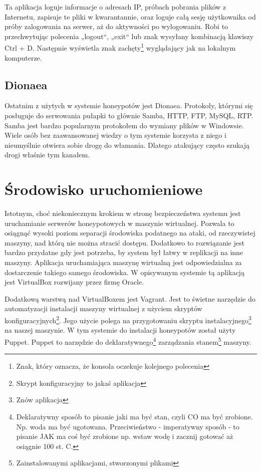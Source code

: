\documentclass[runningheads,a4paper]{llncs}
\begin{document}
Ta aplikacja loguje informacje o adresach IP, próbach pobrania plików z Internetu, zapisuje te pliki w kwarantannie, oraz loguje całą sesję użytkownika od próby zalogowania na serwer, aż do aktywności po wylogowaniu. Robi to przechwytując polecenia „logout“, „exit“ lub znak wysyłany kombinacją klawiszy Ctrl + D. Następnie wyświetla znak zachęty\footnote{Znak, który oznacza, że konsola oczekuje kolejnego polecenia} wyglądający jak na lokalnym komputerze.

\subsection{Dionaea}

Ostatnim z użytych w systemie honeypotów jest Dionaea. Protokoły, którymi się posługuje do serwowania pułapki to głównie Samba, HTTP, FTP, MySQL, RTP. Samba jest bardzo popularnym protokołem do wymiany plików w Windowsie. Wiele osób bez zaawansowanej wiedzy o tym systemie korzysta z niego i nieumyślnie otwiera sobie drogę do włamania. Dlatego atakujący często szukają drogi właśnie tym kanałem.

\section{Środowisko uruchomieniowe}

Istotnym, choć niekoniecznym krokiem w stronę bezpieczeństwa systemu jest uruchamianie serwerów honeypotowych w maszynie wirtualnej. Pozwala to osiągnąć wysoki poziom separacji środowiska podatnego na ataki, od rzeczywistej maszyny, nad którą nie można stracić dostępu. Dodatkowo to rozwiązanie jest bardzo przydatne gdy jest potrzeba, by system był łatwy w replikacji na inne maszyny. Aplikacja uruchamiająca maszynę wirtualną jest odpowiedzialna za dostarczenie takiego samego środowiska. W opisywanym systemie tą aplikacją jest VirtualBox rozwijany przez firmę Oracle.

Dodatkową warstwą nad VirtualBoxem jest Vagrant. Jest to świetne narzędzie do automatyzacji instalacji maszyny wirtualnej z użyciem skryptów konfiguracyjnych\footnote{Skrypt konfiguracyjny to jakaś aplikacja}. Jego użycie polega na przygotowaniu skryptu instalacyjnego\footnote{Znów aplikacja} na naszej maszynie. W tym systemie do instalacji honeypotów został użyty Puppet. Puppet to narzędzie do deklaratywnego\footnote{Deklaratywny sposób to pisanie jaki ma być stan, czyli CO ma być zrobione. Np. woda ma być ugotowana. Przeciwieństwo - imperatywny sposób - to pisanie JAK ma coś być zrobione np. wstaw wodę i zacznij gotować aż osiągnie 100 st. C.} zarządzania stanem\footnote{Zainstalowanymi aplikacjami, stworzonymi plikami} maszyny.
\end{document}
